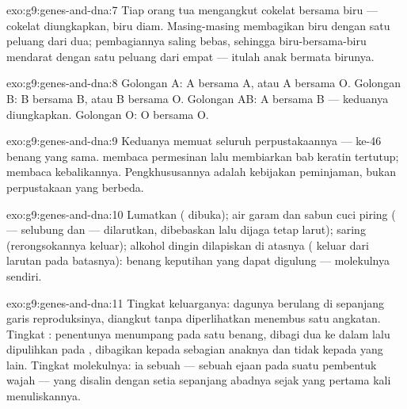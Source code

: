\begin{solution}{exo:g9:genes-and-dna:7}
Tiap orang tua mengangkut cokelat bersama biru --- cokelat
diungkapkan, biru diam. Masing-masing membagikan biru dengan
satu peluang dari dua; pembagiannya saling bebas, sehingga
biru-bersama-biru mendarat dengan satu peluang dari empat
--- itulah anak bermata birunya.
\end{solution}

\begin{solution}{exo:g9:genes-and-dna:8}
Golongan A: A bersama A, atau A bersama O. Golongan B: B
bersama B, atau B bersama O. Golongan AB: A bersama B ---
keduanya diungkapkan. Golongan O: O bersama O.
\end{solution}

\begin{solution}{exo:g9:genes-and-dna:9}
Keduanya memuat seluruh perpustakaannya --- ke-46 benang
yang sama.  membaca  permesinan  lalu
membiarkan bab keratin  tertutup;  
membaca kebalikannya. Pengkhususannya adalah kebijakan
peminjaman, bukan perpustakaan yang berbeda.
\end{solution}

\begin{solution}{exo:g9:genes-and-dna:10}
Lumatkan  ( dibuka); air garam dan sabun cuci
piring ( --- selubung  dan  ---
dilarutkan,  dibebaskan lalu dijaga tetap larut);
saring (rerongsokannya keluar); alkohol dingin dilapiskan di
atasnya ( keluar dari larutan pada batasnya): benang
keputihan yang dapat digulung --- molekulnya sendiri.
\end{solution}

\begin{solution}{exo:g9:genes-and-dna:11}
Tingkat keluarganya: dagunya berulang di sepanjang garis
reproduksinya, diangkut tanpa diperlihatkan menembus satu
angkatan. Tingkat : penentunya menumpang pada
satu benang, dibagi dua ke dalam  lalu dipulihkan
pada , dibagikan kepada sebagian anaknya dan
tidak kepada yang lain. Tingkat molekulnya: ia sebuah 
--- sebuah ejaan pada suatu  pembentuk wajah --- yang
disalin dengan setia sepanjang abadnya sejak  yang
pertama kali menuliskannya.
\end{solution}

